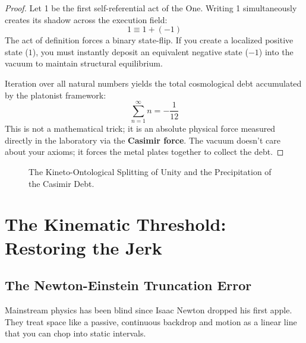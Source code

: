 \documentclass[11pt,a4paper]{article}
\begin{document}
\begin{proof}
Let 1 be the first self-referential act of the One. Writing 1 simultaneously creates its shadow across the execution field:
\[ 1 \equiv 1 + (-1) \]
The act of definition forces a binary state-flip. If you create a localized positive state ($1$), you must instantly deposit an equivalent negative state ($-1$) into the vacuum to maintain structural equilibrium. 

Iteration over all natural numbers yields the total cosmological debt accumulated by the platonist framework:
\[ \sum_{n=1}^\infty n = -\frac{1}{12} \]
This is not a mathematical trick; it is an absolute physical force measured directly in the laboratory via the \textbf{Casimir force}. The vacuum doesn't care about your axioms; it forces the metal plates together to collect the debt.
\end{proof}

\begin{figure}[h!]
\centering
{}
\caption{The Kineto-Ontological Splitting of Unity and the Precipitation of the Casimir Debt.}
\end{figure}

\section{The Kinematic Threshold: Restoring the Jerk}

\subsection{The Newton-Einstein Truncation Error}
Mainstream physics has been blind since Isaac Newton dropped his first apple. They treat space like a passive, continuous backdrop and motion as a linear line that you can chop into static intervals. 
\end{document}
